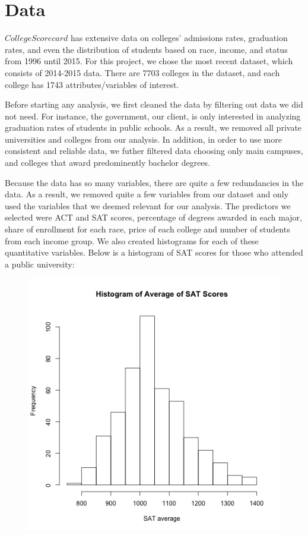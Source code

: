 \documentclass{article}
\begin{document}



\section{Data}

$College Scorecard$ has extensive data on colleges' admissions rates, graduation rates, and even the distribution of students based on race, income, and status from 1996 until 2015. For this project, we chose the most recent dataset, which consists of 2014-2015 data. There are 7703 colleges in the dataset, and each college has 1743 attributes/variables of interest.

Before starting any analysis, we first cleaned the data by filtering out data we did not need. For instance, the government, our client, is only interested in analyzing graduation rates of students in public schools. As a result, we removed all private universities and colleges from our analysis. In addition, in order to use more consistent and reliable data, we futher filtered data choosing only main campuses, and colleges that award predominently bachelor degrees.

Because the data has so many variables, there are quite a few redundancies in the data. As a result, we removed quite a few variables from our dataset and only used the variables that we deemed relevant for our analysis. The predictors we selected were ACT and SAT scores, percentage of degrees awarded in each major, share of enrollment for each race, price of each college and number of students from each income group. We also created histograms for each of these quantitative variables. Below is a histogram of SAT scores for those who attended a public university:

\begin{figure}[!htb]
\includegraphics{../../images/histogram_SAT_avg.png}
\end{figure}
\end{document}
